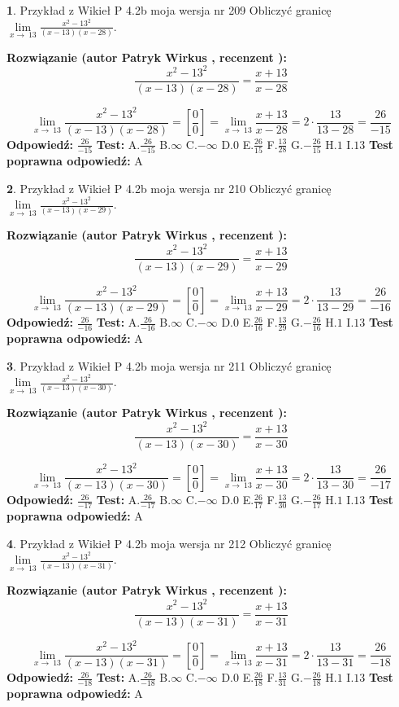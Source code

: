\documentclass[12pt, a4paper]{article}
\theoremstyle{definition} %
\newtheorem{zad}{}
\newcommand{\zadStart}[1]{\begin{zad}#1\newline}
\newcommand{\zadStop}{\end{zad}}
\newcommand{\rozwStart}[2]{\noindent \textbf{Rozwiązanie (autor #1 , recenzent #2): }\newline}
\newcommand{\rozwStop}{\newline}
\newcommand{\odpStart}{\noindent \textbf{Odpowiedź:}\newline}
\newcommand{\odpStop}{\newline}
\newcommand{\testStart}{\noindent \textbf{Test:}\newline}
\newcommand{\testStop}{\newline}
\newcommand{\kluczStart}{\noindent \textbf{Test poprawna odpowiedź:}\newline}
\newcommand{\kluczStop}{\newline}
\begin{document}
\zadStart{Przykład z Wikieł P 4.2b moja wersja nr 209}
Obliczyć granicę $\lim\limits_{x\to\ 13}\frac{x^{2}-13^{2}}{(x-13)(x-28)}$.
\zadStop
\rozwStart{Patryk Wirkus}{}
$$\frac{x^{2}-13^{2}}{(x-13)(x-28)}=\frac{x+13}{x-28}$$

$$\lim\limits_{x\to\ 13}\frac{x^{2}-13^{2}}{(x-13)(x-28)}=[\frac{0}{0}]=\lim\limits_{x\to\ 13}\frac{x+13}{x-28}=2 \cdot \frac{13}{13-28} = \frac{26}{-15}$$
\rozwStop
\odpStart
$\frac{26}{-15}$
\odpStop
\testStart
A.$\frac{26}{-15}$
B.$\infty$
C.$-\infty$
D.$0$
E.$\frac{26}{15}$
F.$\frac{13}{28}$
G.$-\frac{26}{15}$
H.$1$
I.$13$
\testStop
\kluczStart
A
\kluczStop



\zadStart{Przykład z Wikieł P 4.2b moja wersja nr 210}
Obliczyć granicę $\lim\limits_{x\to\ 13}\frac{x^{2}-13^{2}}{(x-13)(x-29)}$.
\zadStop
\rozwStart{Patryk Wirkus}{}
$$\frac{x^{2}-13^{2}}{(x-13)(x-29)}=\frac{x+13}{x-29}$$

$$\lim\limits_{x\to\ 13}\frac{x^{2}-13^{2}}{(x-13)(x-29)}=[\frac{0}{0}]=\lim\limits_{x\to\ 13}\frac{x+13}{x-29}=2 \cdot \frac{13}{13-29} = \frac{26}{-16}$$
\rozwStop
\odpStart
$\frac{26}{-16}$
\odpStop
\testStart
A.$\frac{26}{-16}$
B.$\infty$
C.$-\infty$
D.$0$
E.$\frac{26}{16}$
F.$\frac{13}{29}$
G.$-\frac{26}{16}$
H.$1$
I.$13$
\testStop
\kluczStart
A
\kluczStop



\zadStart{Przykład z Wikieł P 4.2b moja wersja nr 211}
Obliczyć granicę $\lim\limits_{x\to\ 13}\frac{x^{2}-13^{2}}{(x-13)(x-30)}$.
\zadStop
\rozwStart{Patryk Wirkus}{}
$$\frac{x^{2}-13^{2}}{(x-13)(x-30)}=\frac{x+13}{x-30}$$

$$\lim\limits_{x\to\ 13}\frac{x^{2}-13^{2}}{(x-13)(x-30)}=[\frac{0}{0}]=\lim\limits_{x\to\ 13}\frac{x+13}{x-30}=2 \cdot \frac{13}{13-30} = \frac{26}{-17}$$
\rozwStop
\odpStart
$\frac{26}{-17}$
\odpStop
\testStart
A.$\frac{26}{-17}$
B.$\infty$
C.$-\infty$
D.$0$
E.$\frac{26}{17}$
F.$\frac{13}{30}$
G.$-\frac{26}{17}$
H.$1$
I.$13$
\testStop
\kluczStart
A
\kluczStop



\zadStart{Przykład z Wikieł P 4.2b moja wersja nr 212}
Obliczyć granicę $\lim\limits_{x\to\ 13}\frac{x^{2}-13^{2}}{(x-13)(x-31)}$.
\zadStop
\rozwStart{Patryk Wirkus}{}
$$\frac{x^{2}-13^{2}}{(x-13)(x-31)}=\frac{x+13}{x-31}$$

$$\lim\limits_{x\to\ 13}\frac{x^{2}-13^{2}}{(x-13)(x-31)}=[\frac{0}{0}]=\lim\limits_{x\to\ 13}\frac{x+13}{x-31}=2 \cdot \frac{13}{13-31} = \frac{26}{-18}$$
\rozwStop
\odpStart
$\frac{26}{-18}$
\odpStop
\testStart
A.$\frac{26}{-18}$
B.$\infty$
C.$-\infty$
D.$0$
E.$\frac{26}{18}$
F.$\frac{13}{31}$
G.$-\frac{26}{18}$
H.$1$
I.$13$
\testStop
\kluczStart
A
\kluczStop
\end{document}
